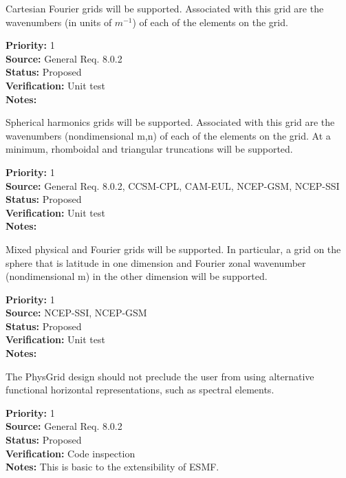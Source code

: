 Cartesian Fourier grids will be supported.  Associated with this grid are the
wavenumbers (in units of $m^{-1}$) of each of the elements on the grid.
\begin{reqlist}
{\bf Priority:} 1 \\
{\bf Source:} General Req. 8.0.2 \\
{\bf Status:} Proposed \\
{\bf Verification:} Unit test\\
{\bf Notes:}
\end{reqlist}

Spherical harmonics grids will be supported.  Associated with this grid are the
wavenumbers (nondimensional m,n) of each of the elements on the grid.  At a
minimum, rhomboidal and triangular truncations will be supported.
\begin{reqlist}
{\bf Priority:} 1 \\
{\bf Source:} General Req. 8.0.2, CCSM-CPL, CAM-EUL, NCEP-GSM, NCEP-SSI \\
{\bf Status:} Proposed \\
{\bf Verification:} Unit test\\
{\bf Notes:}
\end{reqlist}

Mixed physical and Fourier grids will be supported. In particular, a grid on the
sphere that is latitude in one dimension and Fourier zonal wavenumber
(nondimensional m) in the other dimension will be supported.
\begin{reqlist}
{\bf Priority:} 1 \\
{\bf Source:} NCEP-SSI, NCEP-GSM \\
{\bf Status:} Proposed \\
{\bf Verification:} Unit test\\
{\bf Notes:}
\end{reqlist}

The PhysGrid design should not preclude the user from using alternative
functional horizontal representations, such as spectral elements.
\begin{reqlist}
{\bf Priority:} 1 \\
{\bf Source:} General Req. 8.0.2 \\
{\bf Status:} Proposed \\
{\bf Verification:} Code inspection \\
{\bf Notes:} This is basic to the extensibility of ESMF.
\end{reqlist}

